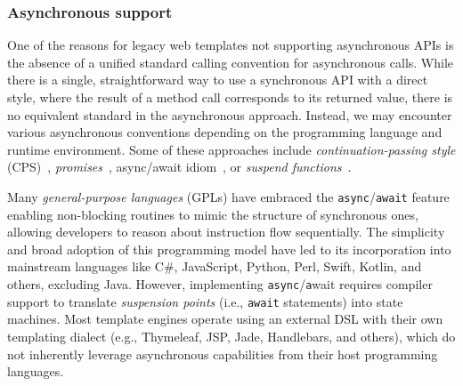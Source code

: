 \subsubsection{Asynchronous support}
\label{sec:async-support}

One of the reasons for legacy web templates not supporting asynchronous APIs is
the absence of a unified standard calling convention for asynchronous calls.
While there is a single, straightforward way to use a synchronous API with a
direct style, where the result of a method call corresponds to its returned
value, there is no equivalent standard in the asynchronous approach. Instead,
we may encounter various asynchronous conventions depending on the programming
language and runtime environment. Some of these approaches include
\emph{continuation-passing style} (CPS)~\cite{scheme},
\textit{promises}~\cite{promise}, async/await idiom~\cite{async_await},
or \textit{suspend functions}~\cite{elizarov2021coroutines}.

Many \textit{general-purpose languages} (GPLs) have embraced the
\texttt{async}/\texttt{await} feature~\cite{async_await} enabling non-blocking
routines to mimic the structure of synchronous ones, allowing developers to
reason about instruction flow sequentially. The simplicity and broad adoption
of this programming model have led to its incorporation into mainstream
languages like C\#, JavaScript, Python, Perl, Swift, Kotlin, and others,
excluding Java. However, implementing \texttt{async}/\texttt{a}wait requires
compiler support to translate \textit{suspension points} (i.e., \texttt{await}
statements) into state machines. Most template engines operate using an
external DSL with their own templating dialect (e.g., Thymeleaf, JSP, Jade,
Handlebars, and others), which do not inherently leverage asynchronous
capabilities from their host programming languages.

